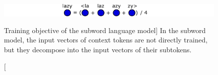 \begin{figure}
\includegraphics{subword-model}
\caption
  [Training objective of the subword language model]%
  {In the subword model, the input vectors of context tokens are not
   directly trained, but they decompose into the input vectors of their
   subtokens.}
\label{fig:subword-model}
\end{figure}

